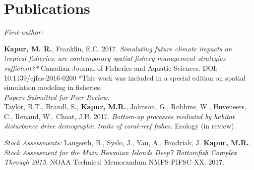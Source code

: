 \documentclass[10pt, letterpaper]{article}
\begin{document}
\section*{Publications}
\noindent \textit{First-author:}

\hangindent=0.5cm \noindent \textbf{Kapur, M. R.}, Franklin, E.C. 2017. \textit{Simulating future climate impacts on tropical fisheries: are contemporary spatial fishery management strategies sufficient?*} Canadian Journal of Fisheries and Aquatic Sciences.  DOI: 10.1139/cjfas-2016-0200 
*This work was included in a special edition on spatial simulation modeling in fisheries. \\

\noindent \textit{Papers Submitted for Peer Review:}\\
\hangindent=0.5cm \noindent Taylor, B.T., Brandl, S., \textbf{Kapur, M.R.},  Johnson, G., Robbins, W., Huveneers, C., Renaud, W., Choat, J.H. 2017.
\textit{Bottom-up processes mediated by habitat disturbance drive demographic traits of coral-reef fishes.} Ecology (in review).\newline

\noindent \textit{Stock Assessments:}\newline
\hangindent=0.5cm \noindent Langseth, B., Syslo, J., Yau, A., Brodziak, J. \textbf{Kapur, M.R.}. \textit{Stock Assessment for the Main Hawaiian Islands Deep7 Bottomfish Complex Through 2015}. NOAA Technical Memorandum NMFS-PIFSC-XX. 2017.  \newline
\end{document}
